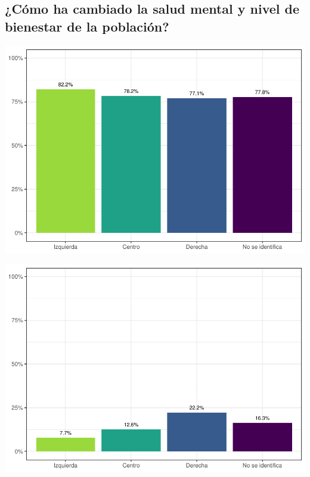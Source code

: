 \documentclass[
  12pt,
]{book}
\begin{document}
\hypertarget{cuxf3mo-ha-cambiado-la-salud-mental-y-nivel-de-bienestar-de-la-poblaciuxf3n}{%
\subsection{¿Cómo ha cambiado la salud mental y nivel de bienestar de la población?}\label{cuxf3mo-ha-cambiado-la-salud-mental-y-nivel-de-bienestar-de-la-poblaciuxf3n}}

\begin{center}\includegraphics{reporte-elsoc_files/figure-latex/unnamed-chunk-18-1} \end{center}

\begin{center}\includegraphics{reporte-elsoc_files/figure-latex/unnamed-chunk-19-1} \end{center}
\end{document}

